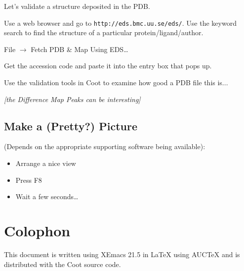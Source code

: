 \documentclass{article}
\begin{document}
\begin{trivlist}
\item Let's validate a structure deposited in the PDB.

\item Use a web browser and go to \texttt{http://eds.bmc.uu.se/eds/}.  Use
the keyword search to find the structure of a particular
protein/ligand/author.  

\item \textsf{File $\rightarrow$ Fetch PDB \& Map Using EDS\ldots}
  
\item Get the accession code and paste it into the entry box that pops
  up.
  
\item Use the validation tools in Coot to examine how good a PDB file
  this is... 

\item \emph{[the Difference Map Peaks can be interesting]}

\end{trivlist}


\subsection{Make a (Pretty?) Picture}

(Depends on the appropriate supporting software being available):

\begin{itemize}
\item Arrange a nice view
\item Press F8
\item Wait a few seconds\ldots
\end{itemize}


\section*{Colophon}

This document is written using XEmacs 21.5 in \LaTeX{} using AUC\TeX{}
and is distributed with the Coot source code.
\end{document}
